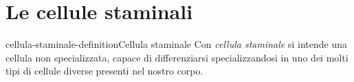 \documentclass[preview]{standalone}
\begin{document}
\genpage

\section{Le cellule staminali}

\begin{snippetdefinition}{cellula-staminale-definition}{Cellula staminale}
    Con \textit{cellula staminale} si intende una cellula non specializzata,
    capace di differenziarsi specializzandosi in uno dei molti tipi di cellule
    diverse presenti nel nostro corpo.
\end{snippetdefinition}

\end{document}
